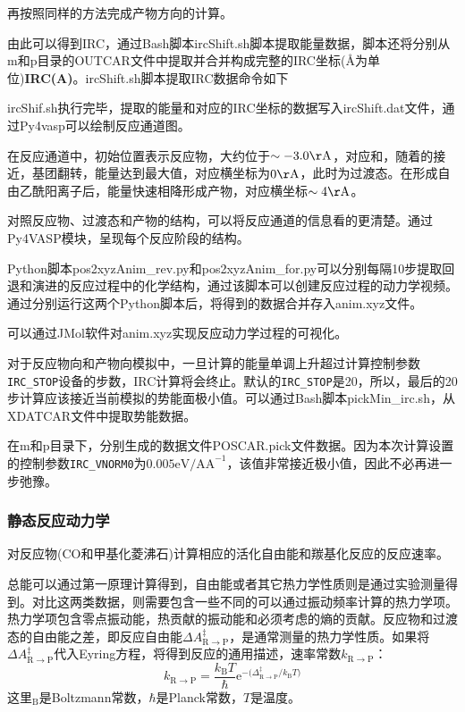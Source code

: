 再按照同样的方法完成产物方向的计算。

由此可以得到\textrm{IRC}，通过\textrm{Bash}脚本\textrm{ircShift.sh}脚本提取能量数据，脚本还将分别从\textrm{m}和\textrm{p}目录的\textrm{OUTCAR}文件中提取并合并构成完整的\textrm{IRC}坐标(\textrm{\AA}为单位)\textbf{IRC(A)}。\textrm{ircShift.sh}脚本提取\textrm{IRC}数据命令如下

\textrm{ircShif.sh}执行完毕，提取的能量和对应的\textrm{IRC}坐标的数据写入\textrm{ircShift.dat}文件，通过\textrm{Py4vasp}可以绘制反应通道图。

在反应通道中，初始位置表示反应物，大约位于$\sim-3.0\mathrm{\AA}$，对应和，随着的接近，基团翻转，能量达到最大值，对应横坐标为$0\mathrm{\AA}$，此时为过渡态。在形成自由乙酰阳离子后，能量快速相降形成产物，对应横坐标$\sim4\mathrm{\AA}$。

对照反应物、过渡态和产物的结构，可以将反应通道的信息看的更清楚。通过\textrm{Py4VASP}模块，呈现每个反应阶段的结构。

\textrm{Python}脚本\textrm{pos2xyzAnim\_rev.py}和\textrm{pos2xyzAnim\_for.py}可以分别每隔10步提取回退和演进的反应过程中的化学结构，通过该脚本可以创建反应过程的动力学视频。通过分别运行这两个\textrm{Python}脚本后，将得到的数据合并存入\textrm{anim.xyz}文件。

可以通过\textrm{JMol}软件对\textrm{anim.xyz}实现反应动力学过程的可视化。

对于反应物向和产物向模拟中，一旦计算的能量单调上升超过计算控制参数\texttt{IRC\_STOP}设备的步数，\textrm{IRC}计算将会终止。默认的\texttt{IRC\_STOP}是20，所以，最后的20步计算应该接近当前模拟的势能面极小值。可以通过\textrm{Bash}脚本\textrm{pickMin\_irc.sh}，从\textrm{XDATCAR}文件中提取势能数据。

在\textrm{m}和\textrm{p}目录下，分别生成的数据文件\textrm{POSCAR.pick}文件数据。因为本次计算设置的控制参数\texttt{IRC\_VNORM0}为$0.005\mathrm{eV/AA}^{-1}$，该值非常接近极小值，因此不必再进一步弛豫。

\subsubsection{静态反应动力学}
对反应物(CO和甲基化菱沸石)计算相应的活化自由能和羰基化反应的反应速率。

总能可以通过第一原理计算得到，自由能或者其它热力学性质则是通过实验测量得到。对比这两类数据，则需要包含一些不同的可以通过振动频率计算的热力学项。热力学项包含零点振动能，热贡献的振动能和必须考虑的熵的贡献。反应物和过渡态的自由能之差，即反应自由能$\Delta A_{\mathrm{R}\rightarrow\mathrm{P}}^{\ddagger}$，是通常测量的热力学性质。如果将$\Delta A_{\mathrm{R}\rightarrow\mathrm{P}}^{\ddagger}$代入\textrm{Eyring}方程，将得到反应的通用描述，速率常数$k_{\mathrm{R}\rightarrow\mathrm{P}}$：
\begin{displaymath}
	k_{\mathrm{R}\rightarrow\mathrm{P}}=\dfrac{k_{\mathrm{B}}T}{\hbar}\mathrm{e}^{-\bigg(\Delta_{\mathrm{R}\rightarrow\mathrm{P}}^{\ddagger}/k_{\mathrm{B}}T\bigg)}
\end{displaymath}
这里$_{\mathrm{B}}$是\textrm{Boltzmann}常数，$\hbar$是\textrm{Planck}常数，$T$是温度。


